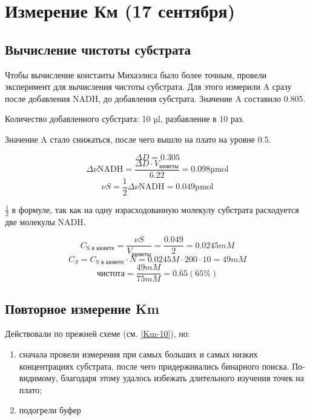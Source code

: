 \section{Измерение Км (17 сентября)}

\subsection{Вычисление чистоты субстрата}
Чтобы вычисление константы Михаэлиса было более точным, провели
эксперимент для вычисления чистоты субстрата.
Для этого измерили A сразу после добавления NADH, до добавления субстрата.
Значение A составило 0.805.

Количество добавленного субстрата: 10 µl, разбавление в 10 раз.

Значение A стало снижаться, после чего вышло на плато на уровне 0.5.

$$ \Delta D = 0.305 $$
$$ \Delta \nu\text{NADH} = \frac{\Delta D \cdot V_\text{кюветы}}{6.22} = 0.098 \text{µmol} $$
$$ \nu S = \frac{1}{2} \Delta \nu\text{NADH} = 0.049 \text{µmol} $$

$\frac{1}{2}$ в формуле, так как на одну израсходованную молекулу субстрата
расходуется две молекулы NADH.

$$ C_\text{S в кювете} = \frac{\nu S}{V_\text{кюветы}} = \frac{0.049}{2} = 0.0245 mM $$
$$ C_S = C_\text{S в кювете} \cdot N = 0.0245 M \cdot 200 \cdot 10 = 49 mM $$
$$ \text{чистота} = \frac{49 mM}{75 mM} = 0.65 (65 \%) $$

\subsection{Повторное измерение Km}
Действовали по прежней схеме (см. \ref{Km-10}), но:
\begin{enumerate}
\item сначала провели измерения при самых больших и самых низких концентрациях субстрата,
    после чего придерживались бинарного поиска.
    По-видимому, благодаря этому удалось избежать длительного изучения точек на плато;
\item подогрели буфер
\end{enumerate}

